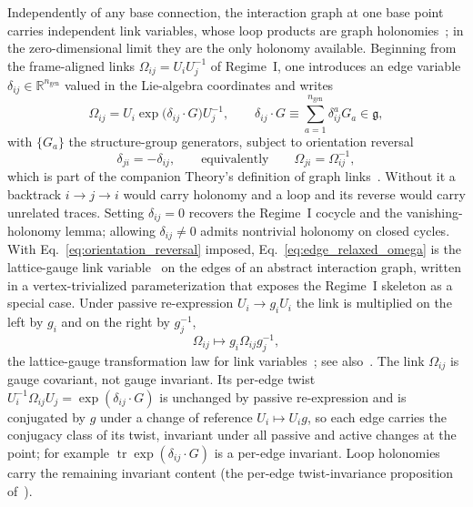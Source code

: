 \documentclass[11pt]{article}
\begin{document}
Independently of any base connection, the interaction graph at one base point carries independent link variables, whose loop products are graph holonomies~\cite[Ch.~2]{DennisGaugeVFE2026}; in the zero-dimensional limit they are the only holonomy available. Beginning from the frame-aligned links $\Omega_{ij} = U_iU_j^{-1}$ of Regime~I, one introduces an edge variable $\delta_{ij} \in \mathbb{R}^{n_{\mathrm{gen}}}$ valued in the Lie-algebra coordinates and writes
\begin{equation}
\Omega_{ij} = U_i \exp\big(\delta_{ij}\cdot G\big) U_j^{-1},
\qquad
\delta_{ij}\cdot G \equiv \sum_{a=1}^{n_{\mathrm{gen}}} \delta_{ij}^{a} G_a \in \mathfrak{g},
\label{eq:edge_relaxed_omega}
\end{equation}
with $\{G_a\}$ the structure-group generators, subject to orientation reversal
\begin{equation}
\delta_{ji} = -\delta_{ij},
\qquad\text{equivalently}\qquad
\Omega_{ji} = \Omega_{ij}^{-1},
\label{eq:orientation_reversal}
\end{equation}
which is part of the companion Theory's definition of graph links~\cite[Ch.~2]{DennisGaugeVFE2026}. Without it a backtrack $i \to j \to i$ would carry holonomy and a loop and its reverse would carry unrelated traces. Setting $\delta_{ij}=0$ recovers the Regime~I cocycle and the vanishing-holonomy lemma; allowing $\delta_{ij}\neq 0$ admits nontrivial holonomy on closed cycles. With Eq.~\eqref{eq:orientation_reversal} imposed, Eq.~\eqref{eq:edge_relaxed_omega} is the lattice-gauge link variable~\cite{WilsonConfinement1974, KogutSusskind1975, Creutz1983} on the edges of an abstract interaction graph, written in a vertex-trivialized parameterization that exposes the Regime~I skeleton as a special case. Under passive re-expression $U_i \to g_i U_i$ the link is multiplied on the left by $g_i$ and on the right by $g_j^{-1}$,
\begin{equation}
\Omega_{ij} \longmapsto g_i \Omega_{ij} g_j^{-1},
\label{eq:omega_gauge_law}
\end{equation}
the lattice-gauge transformation law for link variables~\cite[Eqs.~(3.27)--(3.28)]{WilsonConfinement1974}; see also~\cite{Creutz1983}. The link $\Omega_{ij}$ is gauge covariant, not gauge invariant. Its per-edge twist $U_i^{-1}\Omega_{ij}U_j = \exp(\delta_{ij}\cdot G)$ is unchanged by passive re-expression and is conjugated by $g$ under a change of reference $U_i \mapsto U_ig$, so each edge carries the conjugacy class of its twist, invariant under all passive and active changes at the point; for example $\operatorname{tr}\exp(\delta_{ij}\cdot G)$ is a per-edge invariant. Loop holonomies carry the remaining invariant content (the per-edge twist-invariance proposition of~\cite[Ch.~2]{DennisGaugeVFE2026}).
\end{document}
